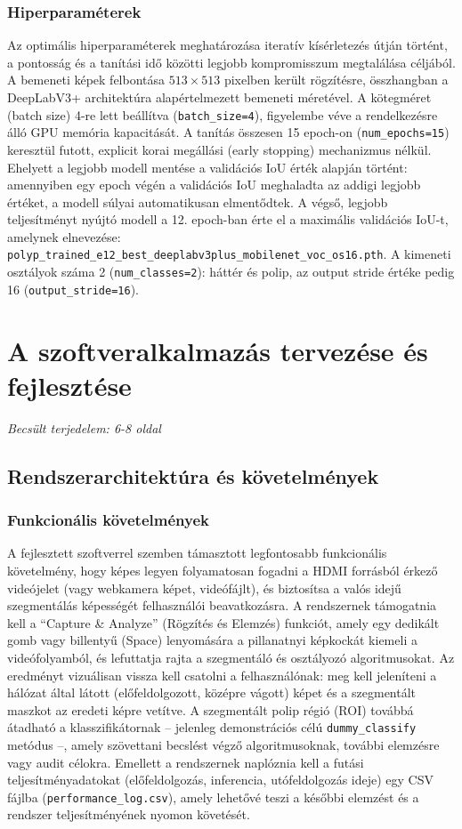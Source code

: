 \documentclass[12pt, a4paper]{report}
\begin{document}
\subsection{Hiperparaméterek}
Az optimális hiperparaméterek meghatározása iteratív kísérletezés útján történt, a pontosság és a tanítási idő közötti legjobb kompromisszum megtalálása céljából. A bemeneti képek felbontása $513 \times 513$ pixelben került rögzítésre, összhangban a DeepLabV3+ architektúra alapértelmezett bemeneti méretével. A kötegméret (batch size) 4-re lett beállítva (\texttt{batch\_size=4}), figyelembe véve a rendelkezésre álló GPU memória kapacitását. A tanítás összesen 15 epoch-on (\texttt{num\_epochs=15}) keresztül futott, explicit korai megállási (early stopping) mechanizmus nélkül. Ehelyett a legjobb modell mentése a validációs IoU érték alapján történt: amennyiben egy epoch végén a validációs IoU meghaladta az addigi legjobb értéket, a modell súlyai automatikusan elmentődtek. A végső, legjobb teljesítményt nyújtó modell a 12. epoch-ban érte el a maximális validációs IoU-t, amelynek elnevezése: \texttt{polyp\_trained\_e12\_best\_deeplabv3plus\_mobilenet\_voc\_os16.pth}. A kimeneti osztályok száma 2 (\texttt{num\_classes=2}): háttér és polip, az output stride értéke pedig 16 (\texttt{output\_stride=16}).

\chapter{A szoftveralkalmazás tervezése és fejlesztése}
\textit{Becsült terjedelem: 6-8 oldal}

\section{Rendszerarchitektúra és követelmények}

\subsection{Funkcionális követelmények}
A fejlesztett szoftverrel szemben támasztott legfontosabb funkcionális követelmény, hogy képes legyen folyamatosan fogadni a HDMI forrásból érkező videójelet (vagy webkamera képet, videófájlt), és biztosítsa a valós idejű szegmentálás képességét felhasználói beavatkozásra. A rendszernek támogatnia kell a ``Capture \& Analyze'' (Rögzítés és Elemzés) funkciót, amely egy dedikált gomb vagy billentyű (Space) lenyomására a pillanatnyi képkockát kiemeli a videófolyamból, és lefuttatja rajta a szegmentáló és osztályozó algoritmusokat. Az eredményt vizuálisan vissza kell csatolni a felhasználónak: meg kell jeleníteni a hálózat által látott (előfeldolgozott, középre vágott) képet és a szegmentált maszkot az eredeti képre vetítve. A szegmentált polip régió (ROI) továbbá átadható a klasszifikátornak – jelenleg demonstrációs célú \texttt{dummy\_classify} metódus –, amely szövettani becslést végző algoritmusoknak, további elemzésre vagy audit célokra. Emellett a rendszernek naplóznia kell a futási teljesítményadatokat (előfeldolgozás, inferencia, utófeldolgozás ideje) egy CSV fájlba (\texttt{performance\_log.csv}), amely lehetővé teszi a későbbi elemzést és a rendszer teljesítményének nyomon követését.
\end{document}
